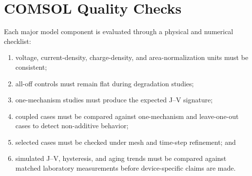 \section{COMSOL Quality Checks}

Each major model component is evaluated through a physical and numerical
checklist:
\begin{enumerate}
\item voltage, current-density, charge-density, and area-normalization units
must be consistent;
\item all-off controls must remain flat during degradation studies;
\item one-mechanism studies must produce the expected J--V signature;
\item coupled cases must be compared against one-mechanism and leave-one-out
cases to detect non-additive behavior;
\item selected cases must be checked under mesh and time-step refinement; and
\item simulated J--V, hysteresis, and aging trends must be compared against
matched laboratory measurements before device-specific claims are made.
\end{enumerate}
